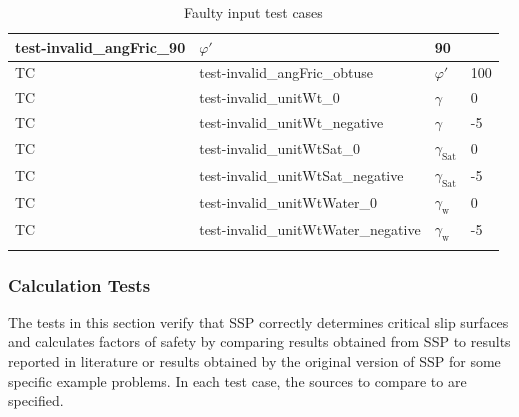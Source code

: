 \documentclass[12pt, titlepage]{article}
\newcounter{testnum} %
\newcommand{\progname}{SSP}
\begin{document}
\begin{longtable}{  l  p{5cm}  l  p{5cm}  }
	test-invalid\_angFric\_90 & $\varphi'$ & 90\\ 
	\hline
	TC{testnum}\thetestnum \label{TC_InvalidAngFricObtuse} & 
	test-invalid\_angFric\_obtuse & $\varphi'$ & 100\\ 
	\hline
	TC{testnum}\thetestnum \label{TC_InvalidUnitWt0} & 
	test-invalid\_unitWt\_0 & $\gamma$ & 0\\ 
	\hline
	TC{testnum}\thetestnum \label{TC_InvalidUnitWtNegative} & 
	test-invalid\_unitWt\_negative & $\gamma$ & -5\\ 
	\hline
	TC{testnum}\thetestnum \label{TC_InvalidUnitWtSat0} & 
	test-invalid\_unitWtSat\_0 & $\gamma_\text{Sat}$ & 0\\ 
	\hline
	TC{testnum}\thetestnum \label{TC_InvalidUnitWtSatNegative} & 
	test-invalid\_unitWtSat\_negative & $\gamma_\text{Sat}$ & -5\\ 
	\hline
	TC{testnum}\thetestnum \label{TC_InvalidUnitWtWater0} & 
	test-invalid\_unitWtWater\_0 & $\gamma_\text{w}$ & 0\\ 
	\hline
	TC{testnum}\thetestnum \label{TC_InvalidUnitWtWaterNegative} 
	& test-invalid\_unitWtWater\_negative & $\gamma_\text{w}$ & -5\\ 
	\hline
	\caption{Faulty input test cases}
	\label{FaultyInputTests}
\end{longtable}


\subsubsection{Calculation Tests} \label{sec_CalcTCs}

The tests in this section verify that \progname{} correctly determines critical 
slip surfaces and calculates factors of safety by comparing results obtained 
from \progname{} to results reported in literature or results obtained by the 
original version of \progname{} for some specific example problems. In each 
test case, the sources to compare to are specified.
\end{document}
